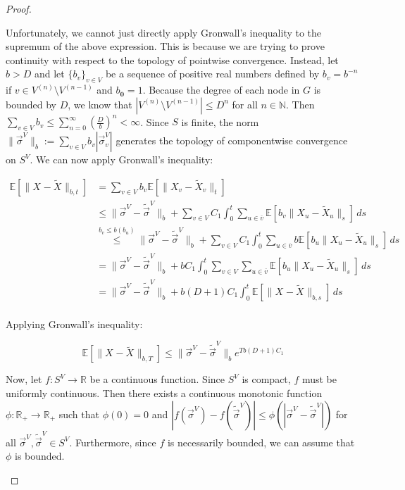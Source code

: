 \documentclass[12pt]{article}
\newcommand{\mb}{\mathbb}
\newcommand{\ra}{\rightarrow}
\newcommand{\ov}{\overline}
\newcommand{\os}{\overset}
\newcommand{\ind}{\hspace{24pt}}
\newcommand{\ex}[1]{\mb{E}\left[#1\right]}			%
\renewcommand{\root}{\mathbf{0}}				%
\renewcommand{\v}{v}							%
\newcommand{\vv}{u}								%
\renewcommand{\S}{S}							%
\newcommand{\s}{\sigma}							%
\newcommand{\sv}{\vec{\s}}						%
\renewcommand{\b}{b}							%
\newcommand{\T}{T}								%
\renewcommand{\t}{t}							%
\renewcommand{\tt}{s}							%
\newcommand{\X}{X}								%
\newcommand{\carp}[1]{^{#1}}					%
\newcommand{\vsi}[1]{^{#1}}						%
\newcommand{\cind}[1]{_{#1}}					%
\newcommand{\cl}{\ov}							%
\newcommand{\tip}[1]{#1}						%
\newcommand{\const}{C}							%
\newcommand{\degr}{D}							%
\newcommand{\sln}[1]{^{(#1)}}					%
\newcommand{\alt}[1]{\widetilde{#1}}			%
\newcommand{\indx}[1]{_{#1}}					%
\begin{document}
\begin{proof}
\begin{enumerate}[(a)]
\ind Unfortunately, we cannot just directly apply Gronwall's inequality to the supremum of the above expression. This is because we are trying to prove continuity with respect to the topology of pointwise convergence. Instead, let \(\b > \degr\) and let \(\{\b\cind{\v}\}_{\v \in V}\) be a sequence of positive real numbers defined by \(\b\cind{\v} = \b^{-n}\) if \(\v \in V\sln{n}\setminus V\sln{n-1}\) and \(\b\cind{\root} = 1\). Because the degree of each node in \(G\) is bounded by \(\degr\), we know that \(|V\sln{n}\setminus V\sln{n-1}| \leq \degr^{n}\) for all \(n\in \mb{N}\). Then \(\sum_{\v \in V} \b\cind{\v} \leq \sum_{n=0}^\infty \left(\frac{\degr}{\b}\right)^{n} < \infty\). Since \(\S\) is finite, the norm \(\|\sv\cind{}\vsi{V}\|_{\b} := \sum_{\v \in V} \b\cind{\v}|\sv\cind{\v}\vsi{V}|\) generates the topology of componentwise convergence on \(\S\carp{V}\). We can now apply Gronwall's inequality:

\begin{align*}
\ex{\|\X\cind{}\tip{} - \alt{\X}\cind{}\tip{}\|_{\b,\t}} &= \sum_{\v \in V} \b\cind{\v}\ex{\|\X\cind{\v}\tip{} - \alt{\X}\cind{\v}\tip{}\|_\t}\\
&\leq \|\sv\cind{}\vsi{V} - \alt{\sv}\cind{}\vsi{V}\|_{\b} + \sum_{\v \in V}\const\indx{1}\int_0^\t \sum_{\vv \in \cl{\v}} \ex{\b\cind{\v}\|\X\cind{\vv}\tip{} - \alt{\X}\cind{\vv}\tip{}\|_\tt}\,d\tt\\
&\os{\b\cind{\v}\leq \b(\b\cind{\vv})}{\leq} \|\sv\cind{}\vsi{V} - \alt{\sv}\cind{}\vsi{V}\|_{\b} + \sum_{\v \in V}\const\indx{1}\int_0^\t \sum_{\vv \in \cl{\v}} \b\ex{\b\cind{\vv}\|\X\cind{\vv}\tip{} - \alt{\X}\cind{\vv}\tip{}\|_\tt}\,d\tt\\
&= \|\sv\cind{}\vsi{V} - \alt{\sv}\cind{}\vsi{V}\|_{\b} + \b\const\indx{1}\int_0^\t \sum_{\v \in V}\sum_{\vv \in \cl{\v}} \ex{\b\cind{\vv}\|\X\cind{\vv}\tip{} - \alt{\X}\cind{\vv}\tip{}\|_\tt}\,d\tt\\
&=\|\sv\cind{}\vsi{V} - \alt{\sv}\cind{}\vsi{V}\|_{\b} + \b(\degr+1)\const\indx{1}\int_0^\t \ex{\|\X\cind{}\tip{} - \alt{\X}\cind{}\tip{}\|_{\b,\tt}}\,d\tt\\
\end{align*}

Applying Gronwall's inequality:

\[\ex{\|\X\cind{}\tip{} - \alt{\X}\cind{}\tip{}\|_{\b,\T}} \leq \|\sv\cind{}\vsi{V} - \alt{\sv}\cind{}\vsi{V}\|_{\b}e^{\T\b(\degr+1)\const\indx{1}}\]

Now, let \(f: \S\carp{V} \ra \mb{R}\) be a continuous function. Since \(\S\carp{V}\) is compact, \(f\) must be uniformly continuous. Then there exists a continuous monotonic function \(\phi: \mb{R}_+ \ra \mb{R}_+\) such that \(\phi(0) = 0\) and \(|f(\sv\cind{}\vsi{V}) - f(\alt{\sv}\cind{}\vsi{V})| \leq \phi(|\sv\cind{}\vsi{V} - \alt{\sv}\cind{}\vsi{V}|)\) for all \(\sv\cind{}\vsi{V},\alt{\sv}\cind{}\vsi{V}\in \S\carp{V}\). Furthermore, since \(f\) is necessarily bounded, we can assume that \(\phi\) is bounded.


\end{enumerate}
\end{proof}
\end{document}
